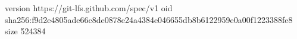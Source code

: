 version https://git-lfs.github.com/spec/v1
oid sha256:f9d2e4805ade66c8de0878e24a4384e046655db8b6122959e0a00f1223388fe8
size 524384
